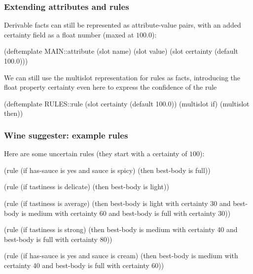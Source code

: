 \documentclass[xcolor={usenames,dvipsnames,svgnames}, compress]{beamer}
\begin{document}
\begin{frame}[fragile]
  \frametitle{Extending attributes and rules}
  Derivable facts can still be represented as attribute-value pairs,
  with an added \textsf{certainty} field as a float number (maxed at $100.0$):
  \begin{clips-code}[numbers=none]
    (deftemplate MAIN::attribute
        (slot name)
        (slot value)
        (slot certainty (default 100.0)))
  \end{clips-code}

  We can still use the multislot representation for rules as facts,
  introducing the float property \textsf{certainty} even here to
  express the confidence of the rule
  \begin{clips-code}[numbers=none]
    (deftemplate RULES::rule
        (slot certainty (default 100.0))
        (multislot if)
        (multislot then))
  \end{clips-code}
\end{frame}

\begin{frame}[fragile]
  \frametitle{Wine suggester: example rules}
  Here are some uncertain rules (they start with a certainty of $100$):
  \begin{clips-code}[numbers=none]
    (rule (if has-sauce is yes and  sauce is spicy)
          (then best-body is full))

    (rule (if tastiness is delicate)
          (then best-body is light))

    (rule (if tastiness is average)
          (then best-body is light with certainty 30 and
                best-body is medium with certainty 60 and
                best-body is full with certainty 30))

    (rule (if tastiness is strong)
          (then best-body is medium with certainty 40 and
                best-body is full with certainty 80))

    (rule (if has-sauce is yes and sauce is cream)
          (then best-body is medium with certainty 40 and
                best-body is full with certainty 60))
  \end{clips-code}
\end{frame}
\end{document}
